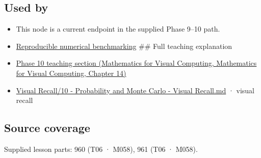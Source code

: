 \subsection{Used by}\label{appendix-c83016554b1e-used-by}

\begin{itemize}
\item
  This node is a current endpoint in the supplied Phase 9--10 path.
\item
  \hyperref[appendix-b9db93e28371]{Reproducible numerical benchmarking} \#\# Full teaching explanation
\item
  \href{../02-Mathematics-for-Visual-Computing/main.pdf\#nameddest=02-foundations-ii-ch030-inference-and-error-metrics-need-explicit-assumptions}{Phase 10 teaching section (Mathematics for Visual Computing, Mathematics for Visual Computing, Chapter 14)}
\item
  \hyperref[appendix-cb5af353ef77]{Visual Recall/10 - Probability and Monte Carlo - Visual Recall.md} · visual recall
\end{itemize}

\subsection{Source coverage}\label{appendix-c83016554b1e-source-coverage}

Supplied lesson parts: 960 (T06 · M058), 961 (T06 · M058).
